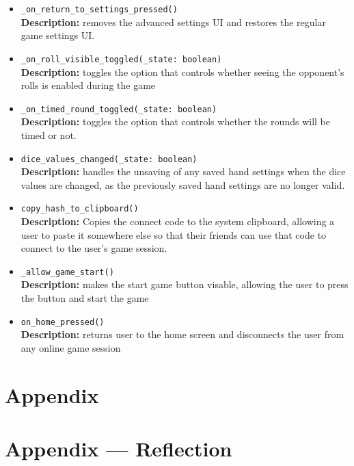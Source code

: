 \documentclass[12pt, titlepage]{article}
\begin{document}
\begin{itemize}
	\item \texttt{\_on\_return\_to\_settings\_pressed() }\\
	\textbf{Description:} removes the advanced settings UI and restores the regular game settings UI.
	\item \texttt{\_on\_roll\_visible\_toggled(\_state: boolean) }\\
	\textbf{Description:} toggles the option that controls whether seeing the opponent's rolls is enabled during the game 
	\item \texttt{\_on\_timed\_round\_toggled(\_state: boolean) }\\
	\textbf{Description:} toggles the option that controls whether the rounds will be timed or not.
	\item \texttt{dice\_values\_changed(\_state: boolean) }\\
	\textbf{Description:} handles the unsaving of any saved hand settings when the dice values are changed, as the previously saved hand settings are no longer valid.
	\item \texttt{copy\_hash\_to\_clipboard() }\\
	\textbf{Description:} Copies the connect code to the system clipboard, allowing a user to paste it somewhere else so that their friends can use that code to connect to the user's game session.
	\item \texttt{\_allow\_game\_start() }\\
	\textbf{Description:} makes the start game button visable, allowing the user to press the button and start the game
	\item \texttt{on\_home\_pressed() }\\
	\textbf{Description:} returns user to the home screen and disconnects the user from any online game session
	 
	
	
\end{itemize}



\newpage

\section{Appendix} \label{Appendix}


\newpage{}

\section*{Appendix --- Reflection}
\end{document}
